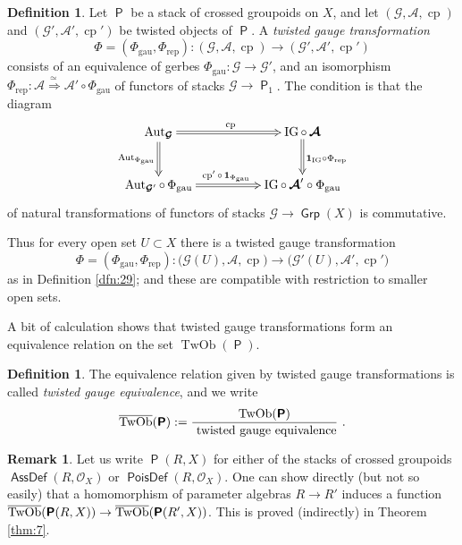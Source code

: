 \documentclass[a4paper, 10pt]{amsart}
\theoremstyle{definition}
\newtheorem{dfn}[equation]{Definition}
\newtheorem{rem}[equation]{Remark}
\numberwithin{equation}{section}
\newcommand{\opn}{\operatorname}
\newcommand{\cat}[1]{\operatorname{\mathsf{#1}}}
\newcommand{\ol}{\overline}
\newcommand{\mcal}[1]{\mathcal{#1}}
\newcommand{\mrm}[1]{\mathrm{#1}}
\newcommand{\tup}[1]{\textup{#1}}
\newcommand{\bsym}[1]{\boldsymbol{#1}}
\newcommand{\twoiso}{\stackrel{\simeq\ }{\Longrightarrow}}
\newcommand{\gerbe}[1]{\bsym{\mcal{#1}}}
\newcommand{\twocat}[1]{\operatorname{\bsym{\cat{#1}}}}
\newcommand{\lb}{\linebreak}
\begin{document}
\begin{dfn} \label{dfn:33}
Let $\twocat{P}$ be a stack of crossed groupoids on $X$, and 
let $(\gerbe{G}, \gerbe{A}, \opn{cp})$ and
$(\gerbe{G}', \gerbe{A}', \opn{cp}')$ be twisted objects of $\twocat{P}$.
A {\em twisted gauge transformation} 
\[ \Phi = (\Phi_{\mrm{gau}}, \Phi_{\mrm{rep}}) :
(\gerbe{G}, \gerbe{A}, \opn{cp}) \to 
(\gerbe{G}', \gerbe{A}', \opn{cp}') \]
consists of an equivalence of gerbes 
$\Phi_{\mrm{gau}} : \gerbe{G} \to \gerbe{G}'$,
and an isomorphism 
$\Phi_{\mrm{rep}} : \gerbe{A} \twoiso \gerbe{A}' \circ \Phi_{\mrm{gau}}$
of functors of stacks  $\gerbe{G} \to \twocat{P}_1$.
The condition is that the diagram 
\[ \UseTips \xymatrix @C=12ex @R=6ex {
\opn{Aut}_{\gerbe{G}}
\ar@{=>}[r]^{\opn{cp}}
\ar@{=>}[d]_{\opn{Aut}_{\Phi_{\mrm{gau}}}}
& 
\opn{IG} \circ \, \gerbe{A}
\ar@{=>}[d]^{\bsym{1}_{\opn{IG}} \circ \Phi_{\mrm{rep}}}
\\
\opn{Aut}_{\gerbe{G}'} \circ \, \Phi_{\mrm{gau}}
\ar@{=>}[r]^(0.47){\opn{cp}' \circ\, \bsym{1}_{\Phi_{\mrm{gau}}}}
& 
\opn{IG} \circ \, \gerbe{A}' \circ \Phi_{\mrm{gau}}
} \]
of natural transformations of functors of stacks
$\gerbe{G} \to \twocat{Grp} (X)$
is commutative.
\end{dfn}

Thus for every open set $U \subset X$ there is a twisted gauge
transformation
\[ \Phi = (\Phi_{\mrm{gau}}, \Phi_{\mrm{rep}}) :
\bigl( \gerbe{G}(U), \gerbe{A}, \opn{cp} \bigr) \to 
\bigl( \gerbe{G}'(U), \gerbe{A}', \opn{cp}' \bigr)  \]
as in Definition \ref{dfn:29}; and these are compatible with
restriction to smaller open sets.

A bit of calculation shows that twisted gauge transformations form an
equivalence relation on the
set $\opn{TwOb}(\twocat{P})$. 

\begin{dfn}
The equivalence relation given by twisted gauge transformations
is called {\em twisted gauge equivalence}, and we write
\[ \ol{\opn{TwOb}}(\twocat{P}) :=
\frac{ \opn{TwOb}(\twocat{P}) }
{\tup{ twisted gauge equivalence}} \ . \] 
\end{dfn}

\begin{rem} \label{rem:300}
Let us write $\twocat{P}(R, X)$ for either of the stacks of crossed groupoids
$\twocat{AssDef}(R, \mcal{O}_X)$ or $\twocat{PoisDef}(R, \mcal{O}_X)$.
One can show directly (but not so easily) that a homomorphism of parameter
algebras $R \to R'$ induces a function 
$\ol{\opn{TwOb}}(\twocat{P}(R, X)) \lb \to \ol{\opn{TwOb}}(\twocat{P}(R', X))$.
This is proved (indirectly) in Theorem \ref{thm:7}.
\end{rem}
\end{document}
